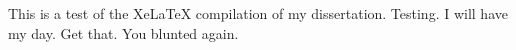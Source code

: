 \documentclass{memoir}
\begin{document}
This is a test of the XeLaTeX compilation of my
dissertation. Testing. I will have my day. Get that. You blunted again.
\end{document}
